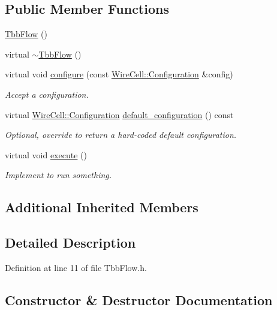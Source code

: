 \subsection*{Public Member Functions}
\begin{DoxyCompactItemize}
\item 
\hyperlink{class_wire_cell_tbb_1_1_tbb_flow_aa477e1c118ddfd9ffe8cba3a691c20fc}{Tbb\+Flow} ()
\item 
virtual \hyperlink{class_wire_cell_tbb_1_1_tbb_flow_a8087921efab90664efa8c730b90af5ac}{$\sim$\+Tbb\+Flow} ()
\item 
virtual void \hyperlink{class_wire_cell_tbb_1_1_tbb_flow_aad4ef0b553f5efdbe2558fad84373ab9}{configure} (const \hyperlink{namespace_wire_cell_a9f705541fc1d46c608b3d32c182333ee}{Wire\+Cell\+::\+Configuration} \&config)
\begin{DoxyCompactList}\small\item\em Accept a configuration. \end{DoxyCompactList}\item 
virtual \hyperlink{namespace_wire_cell_a9f705541fc1d46c608b3d32c182333ee}{Wire\+Cell\+::\+Configuration} \hyperlink{class_wire_cell_tbb_1_1_tbb_flow_a8dacc14b5763a06f06e508aff481b9d2}{default\+\_\+configuration} () const
\begin{DoxyCompactList}\small\item\em Optional, override to return a hard-\/coded default configuration. \end{DoxyCompactList}\item 
virtual void \hyperlink{class_wire_cell_tbb_1_1_tbb_flow_a2a1da2a872decd5c243bf2fbd832bef6}{execute} ()
\begin{DoxyCompactList}\small\item\em Implement to run something. \end{DoxyCompactList}\end{DoxyCompactItemize}
\subsection*{Additional Inherited Members}


\subsection{Detailed Description}


Definition at line 11 of file Tbb\+Flow.\+h.



\subsection{Constructor \& Destructor Documentation}
\mbox{\label{class_wire_cell_tbb_1_1_tbb_flow_aa477e1c118ddfd9ffe8cba3a691c20fc}} 
